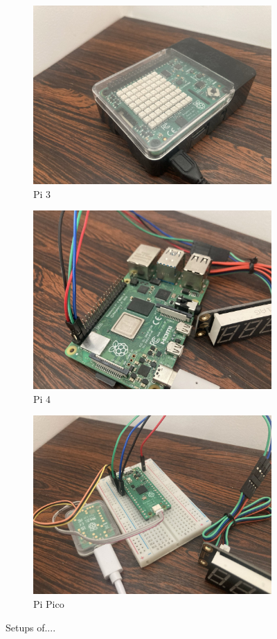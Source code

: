 \begin{figure}[h!]
\centering
\begin{subfigure}{.5\textwidth}
  \centering
  \includegraphics[width=0.8\linewidth]{figures/pi_3}
  \caption{Pi 3}
  \label{fig:pi3}
\end{subfigure}%
\begin{subfigure}{.5\textwidth}
  \centering
  \includegraphics[width=0.8\linewidth]{figures/pi_4}
  \caption{Pi 4}
  \label{fig:pi4}
\end{subfigure}
\hfill
\begin{subfigure}{.5\textwidth}
  \centering
  \includegraphics[width=0.8\linewidth]{figures/pi_pico}
  \caption{Pi Pico}
  \label{fig:pi_pico}
\end{subfigure}

\caption{Setups of....}
\end{figure}

